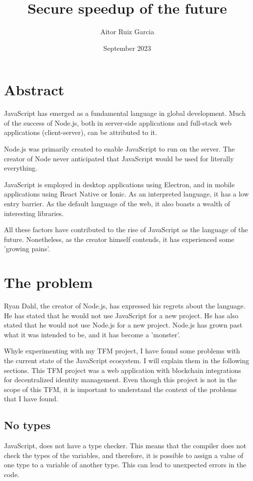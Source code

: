 \documentclass[12pt, letterpaper]{article}
\title{Secure speedup of the future}
\author{Aitor Ruiz Garcia}
\date{September 2023}
\begin{document}
\maketitle
\begin{multicols}{2}
    \section{Abstract}
    JavaScript has emerged as a fundamental language in global development. Much of the success of Node.js, both in server-side applications and full-stack web applications (client-server), can be attributed to it.

    Node.js was primarily created to enable JavaScript to run on the server. The creator of Node never anticipated that JavaScript would be used for literally everything.

    JavaScript is employed in desktop applications using Electron, and in mobile applications using React Native or Ionic. As an interpreted language, it has a low entry barrier. As the default language of the web, it also boasts a wealth of interesting libraries.

    All these factors have contributed to the rise of JavaScript as the language of the future. Nonetheless, as the creator himself contends, it has experienced some 'growing pains'.
    \section{The problem}

    Ryan Dahl, the creator of Node.js, has expressed his regrets about the language. He has stated that he would not use JavaScript for a new project. He has also stated that he would not use Node.js for a new project. Node.js has grown past what it was intended to be, and it has become a 'monster'.

    Whyle experimenting with my TFM project, I have found some problems with the current state of the JavaScript ecosystem. I will explain them in the following sections. This TFM project was a web application with blockchain integrations for decentralized identity management. Even though this project is not in the scope of this TFM, it is important to understand the context of the problems that I have found.

    \subsection{No types}
    JavaScript, does not have a type checker. This means that the compiler does not check the types of the variables, and therefore, it is possible to assign a value of one type to a variable of another type. This can lead to unexpected errors in the code.


\end{multicols}
\end{document}
